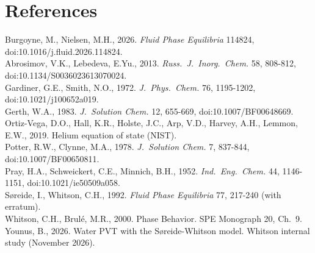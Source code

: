 \documentclass[10pt,a4paper]{article}
\begin{document}
\section*{References}
\small
Burgoyne, M., Nielsen, M.H., 2026. \emph{Fluid Phase Equilibria} 114824, doi:10.1016/j.fluid.2026.114824.\\
Abrosimov, V.K., Lebedeva, E.Yu., 2013. \emph{Russ.\ J.\ Inorg.\ Chem.} 58, 808-812, doi:10.1134/S0036023613070024.\\
Gardiner, G.E., Smith, N.O., 1972. \emph{J.\ Phys.\ Chem.} 76, 1195-1202, doi:10.1021/j100652a019.\\
Gerth, W.A., 1983. \emph{J.\ Solution Chem.} 12, 655-669, doi:10.1007/BF00648669.\\
Ortiz-Vega, D.O., Hall, K.R., Holste, J.C., Arp, V.D., Harvey, A.H., Lemmon, E.W., 2019. Helium equation of state (NIST).\\
Potter, R.W., Clynne, M.A., 1978. \emph{J.\ Solution Chem.} 7, 837-844, doi:10.1007/BF00650811.\\
Pray, H.A., Schweickert, C.E., Minnich, B.H., 1952. \emph{Ind.\ Eng.\ Chem.} 44, 1146-1151, doi:10.1021/ie50509a058.\\
Søreide, I., Whitson, C.H., 1992. \emph{Fluid Phase Equilibria} 77, 217-240 (with erratum).\\
Whitson, C.H., Brulé, M.R., 2000. Phase Behavior. SPE Monograph 20, Ch.~9.\\
Younus, B., 2026. Water PVT with the Søreide-Whitson model. Whitson internal study (November 2026).
\end{document}
